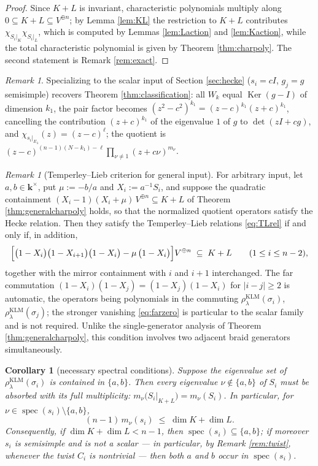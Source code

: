 \documentclass[11pt]{article}
\newtheorem{corollary}[theorem]{Corollary}
\theoremstyle{definition}
\theoremstyle{remark}
\newtheorem{remark}[theorem]{Remark}
\newcommand{\Ker}{\operatorname{Ker}}
\newcommand{\spec}{\operatorname{spec}}
\newcommand{\kk}{\boldsymbol{k}}
\newcommand{\rKLM}{\rho^{\mathrm{KLM}}_{\lambda}}
\begin{document}
\begin{proof}
Since $K + L$ is invariant, characteristic polynomials multiply along
$0 \subseteq K + L \subseteq V^{\oplus n}$; by Lemma \ref{lem:KL} the
restriction to $K + L$ contributes
$\chi_{S_i|_K}\chi_{S_i|_L}$, which is computed by Lemmas
\ref{lem:Laction} and \ref{lem:Kaction}, while the total
characteristic polynomial is given by Theorem \ref{thm:charpoly}. The
second statement is Remark \ref{rem:exact}.
\end{proof}

\begin{remark}\label{rem:scalarcheck}
Specializing to the scalar input of Section \ref{sec:hecke}
($s_i = cI$, $g_j = g$ semisimple) recovers Theorem
\ref{thm:classification}: all $W_k$ equal $\Ker(g-I)$ of dimension
$k_1$, the pair factor becomes
$(z^2 - c^2)^{k_1} = (z-c)^{k_1}(z+c)^{k_1}$, cancelling the
contribution $(z + c)^{k_1}$ of the eigenvalue $1$ of $g$ to
$\det(zI + cg)$, and $\chi_{s_i|_{E_\lambda}}(z) = (z - c)^{\ell}$; the
quotient is
$(z-c)^{(n-1)(N-k_1)-\ell}\prod_{\nu \neq 1}(z + c\nu)^{m_\nu}$.
\end{remark}

\begin{remark}[Temperley--Lieb criterion for general input]
\label{rem:TLgeneral}
For arbitrary input, let $a, b \in \kk^{\times}$, put $\mu := -b/a$ and
$X_i := a^{-1} S_i$, and suppose the quadratic containment
$(X_i - 1)(X_i + \mu)\, V^{\oplus n} \subseteq K + L$ of Theorem
\ref{thm:generalcharpoly} holds, so that the normalized quotient
operators satisfy the Hecke relation. Then they satisfy the
Temperley--Lieb relations \eqref{eq:TLrel} if and only if, in addition,
\[
\Bigl[
\bigl(1 - X_i\bigr)\bigl(1 - X_{i+1}\bigr)\bigl(1 - X_i\bigr)
- \mu\,\bigl(1 - X_i\bigr)
\Bigr] V^{\oplus n} \;\subseteq\; K + L
\qquad (1 \le i \le n-2),
\]
together with the mirror containment with $i$ and $i+1$ interchanged.
The far commutation $(1 - X_i)(1 - X_j) = (1 - X_j)(1 - X_i)$ for
$|i - j| \geq 2$ is automatic, the operators being polynomials in the
commuting $\rKLM(\sigma_i)$, $\rKLM(\sigma_j)$; the stronger vanishing
\eqref{eq:farzero} is particular to the scalar family and is not
required. Unlike the single-generator analysis of Theorem
\ref{thm:generalcharpoly}, this condition involves two adjacent braid
generators simultaneously.
\end{remark}


\begin{corollary}[necessary spectral conditions]\label{cor:necessary}
Suppose the eigenvalue set of $\rKLM(\sigma_i)$ is contained in
$\{a, b\}$. Then every eigenvalue $\nu \notin \{a,b\}$ of $S_i$ must be
absorbed with its full multiplicity:
$m_{\nu}\bigl(S_i|_{K+L}\bigr) = m_{\nu}(S_i)$. In particular, for
$\nu \in \spec(s_i) \setminus \{a, b\}$,
\[
(n-1)\, m_{\nu}(s_i) \;\leq\; \dim K + \dim L .
\]
Consequently, if $\dim K + \dim L < n - 1$, then
$\spec(s_i) \subseteq \{a, b\}$; if moreover $s_i$ is semisimple and is
not a scalar --- in particular, by Remark \ref{rem:twist}, whenever the
twist $C_i$ is nontrivial --- then both $a$ and $b$ occur in
$\spec(s_i)$.
\end{corollary}
\end{document}
